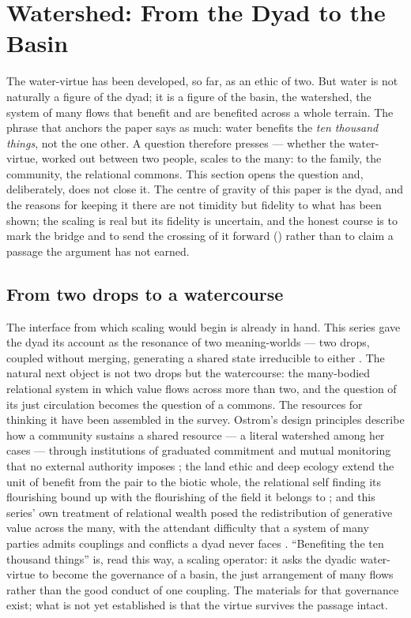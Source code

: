 \section{Watershed: From the Dyad to the Basin}
\label{p20:sec:watershed}

\noindent
The water-virtue has been developed, so far, as an ethic of two. But water is not naturally a figure of the dyad; it is a figure of the basin, the watershed, the system of many flows that benefit and are benefited across a whole terrain. The phrase that anchors the paper says as much: water benefits the \emph{ten thousand things}, not the one other. A question therefore presses --- whether the water-virtue, worked out between two people, scales to the many: to the family, the community, the relational commons. This section opens the question and, deliberately, does not close it. The centre of gravity of this paper is the dyad, and the reasons for keeping it there are not timidity but fidelity to what has been shown; the scaling is real but its fidelity is uncertain, and the honest course is to mark the bridge and to send the crossing of it forward () rather than to claim a passage the argument has not earned.

\subsection{From two drops to a watercourse}
\label{p20:sub:watershed-scale}

The interface from which scaling would begin is already in hand. This series gave the dyad its account as the resonance of two meaning-worlds --- two drops, coupled without merging, generating a shared state irreducible to either \parencite{paperxix}. The natural next object is not two drops but the watercourse: the many-bodied relational system in which value flows across more than two, and the question of its just circulation becomes the question of a commons. The resources for thinking it have been assembled in the survey. Ostrom's design principles describe how a community sustains a shared resource --- a literal watershed among her cases --- through institutions of graduated commitment and mutual monitoring that no external authority imposes \parencite{ostrom1990}; the land ethic and deep ecology extend the unit of benefit from the pair to the biotic whole, the relational self finding its flourishing bound up with the flourishing of the field it belongs to \parencite{leopold1949,naess1973}; and this series' own treatment of relational wealth posed the redistribution of generative value across the many, with the attendant difficulty that a system of many parties admits couplings and conflicts a dyad never faces \parencite{paperxv}. ``Benefiting the ten thousand things'' is, read this way, a scaling operator: it asks the dyadic water-virtue to become the governance of a basin, the just arrangement of many flows rather than the good conduct of one coupling. The materials for that governance exist; what is not yet established is that the virtue survives the passage intact.

